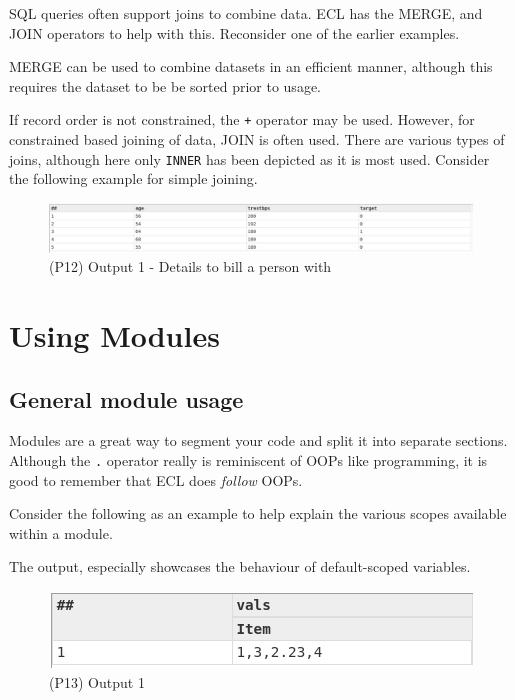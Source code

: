 SQL queries often support joins to combine data. ECL has the MERGE, and JOIN operators to help with this. Reconsider one of the earlier examples.

MERGE can be used to combine datasets in an efficient manner, although this requires the dataset to be be sorted prior to usage. 


If record order is not constrained, the \lstinline{+} operator may be used. 
However, for constrained based joining of data, JOIN is often used. There are various types of joins, although here only \lstinline{INNER} has been depicted as it is most used. Consider the following example for simple joining.



\begin{figure}[h]
    \centering
    \includegraphics[width=.92\linewidth]{../output/63/3}
    \caption{(P12) Output 1 - Details to bill a person with}
\end{figure}


\chapter{Using Modules}
\section{General module usage}
Modules are a great way to segment your code and split it into separate sections.
Although the \lstinline!.! operator really is reminiscent of OOPs like programming, it is good to remember that ECL does \textit{follow} OOPs.

Consider the following as an example to help explain the various scopes available within a module.




The output, especially showcases the behaviour of default-scoped variables.
\begin{figure}[h]
    \centering
    \includegraphics[width=.6\linewidth]{../output/75/1}
    \caption{(P13) Output 1}
\end{figure}

